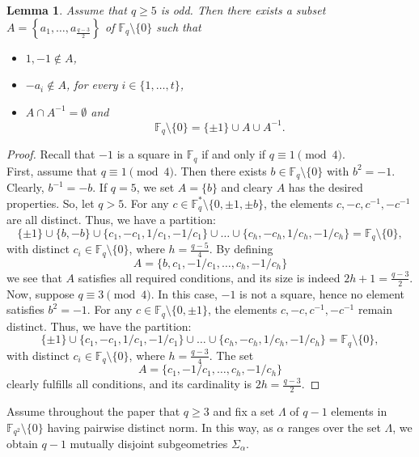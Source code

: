 \documentclass[11pt]{article}
\newtheorem{lemma}[theorem]{Lemma}
\theoremstyle{definition}
\numberwithin{equation}{section}
\def\F{{\mathbb F}}
\begin{document}
\begin{lemma} \label{lm:partitionnorm}
    Assume that $q \geq 5$ is odd. Then there exists a subset $A=\left\{a_1,\ldots,a_\frac{q-3}{2}\right\}$ of $\F_q \setminus \{0\}$ such that 
    \begin{itemize}
        \item $1,-1 \notin A$, 
        \item $-a_i \notin A$, for every $i \in \{1,\ldots,t\}$,
        \item $A \cap A^{-1}=\emptyset$ and
    \[
        \F_q \setminus \{0\} = \{\pm 1\} \cup A \cup A^{-1}.
        \]
        \end{itemize}
\end{lemma}
\begin{proof}
    Recall that $-1$ is a square in $\F_q$ if and only if $q \equiv 1 \pmod{4}$. \\
    First, assume that $q \equiv 1 \pmod{4}$. Then there exists $b \in \F_q \setminus \{0\}$ with $b^2 = -1$. Clearly, $b^{-1} = -b$. If $q = 5$, we set $A = \{b\}$ and cleary $A$ has the desired properties. So, let $q > 5$. For any $c \in \F_q^* \setminus \{0, \pm 1, \pm b\}$, the elements $c, -c, c^{-1}, -c^{-1}$ are all distinct. Thus, we have a partition:
    \[
    \{\pm 1\} \cup \{b,-b\} \cup \{c_1,-c_1,1/c_1,-1/c_1\} \cup \ldots \cup \{c_h,-c_h,1/c_h,-1/c_h\} = \F_q \setminus \{0\}, 
    \]
  with distinct $c_i \in \F_q \setminus \{0\}$, where $h = \frac{q - 5}{4}$. By defining
    \[
    A=\{b,c_1,-1/c_1,\ldots,c_h,-1/c_h\}
    \]
    we see that $A$ satisfies all required conditions, and its size is indeed $2h+1=\frac{q-3}{2}$.\\
   Now, suppose $q \equiv 3 \pmod{4}$. In this case, $-1$ is not a square, hence no element satisfies $b^2 = -1$. For any $c \in \F_q \setminus \{0, \pm 1\}$, the elements $c, -c, c^{-1}, -c^{-1}$ remain distinct. Thus, we have the partition:
    \[
    \{\pm 1\} \cup \{c_1,-c_1,1/c_1,-1/c_1\} \cup \ldots \cup \{c_h,-c_h,1/c_h,-1/c_h\} = \F_q \setminus \{0\}, 
    \]
    with distinct $c_i \in \F_q \setminus \{0\}$, where $h = \frac{q - 3}{4}$. The set 
    \[
    A=\{c_1,-1/c_1,\ldots,c_h,-1/c_h\}
    \]
    clearly fulfills all conditions, and its cardinality is $2h=\frac{q-3}{2}$.
\end{proof}
Assume throughout the paper that $q \ge 3$ and fix a set $\Lambda$ of $q-1$ elements in $\F_{q^2} \setminus \{0\}$ having pairwise distinct norm. In this way, as $\alpha$ ranges over the set $\Lambda$, we obtain $q - 1$ mutually disjoint subgeometries $\Sigma_\alpha$.
\end{document}
